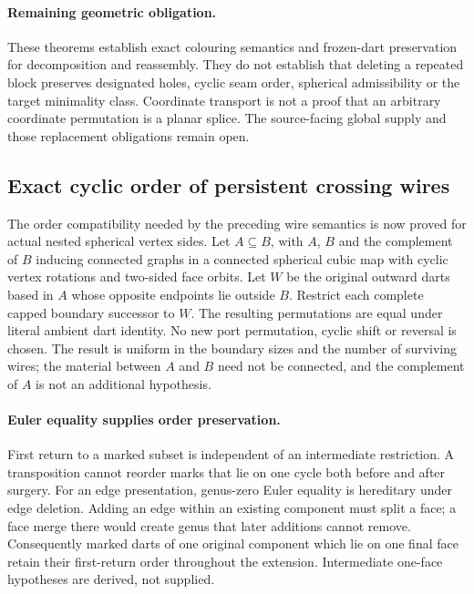 \paragraph{Remaining geometric obligation.}
These theorems establish exact colouring semantics and frozen-dart
preservation for decomposition and reassembly.  They do not establish
that deleting a repeated block preserves designated holes, cyclic seam
order, spherical admissibility or the target minimality class.  Coordinate
transport is not a proof that an arbitrary coordinate permutation is a
planar splice.  The source-facing global supply and those replacement
obligations remain open.

\subsection{Exact cyclic order of persistent crossing wires}
\label{sec:persistent-wire-order}

The order compatibility needed by the preceding wire semantics is now
proved for actual nested spherical vertex sides.  Let $A\subseteq B$,
with $A$, $B$ and the complement of $B$ inducing connected graphs in
a connected spherical cubic map with cyclic vertex rotations and two-sided
face orbits.  Let $W$
be the original outward darts based in $A$ whose opposite endpoints lie
outside $B$.  Restrict each complete capped boundary successor to $W$.
The resulting permutations are equal under literal ambient dart identity.
No new port permutation, cyclic shift or reversal is chosen.
The result is uniform in the boundary sizes and the number of surviving
wires; the material between $A$ and $B$ need not be connected, and the
complement of $A$ is not an additional hypothesis.

\paragraph{Euler equality supplies order preservation.}
First return to a marked subset is independent of an intermediate
restriction.  A transposition cannot reorder marks that lie on one cycle
both before and after surgery.
For an edge presentation, genus-zero Euler equality is hereditary under
edge deletion.  Adding an edge within an existing component must split
a face; a face merge there would create genus that later additions cannot
remove.  Consequently marked darts of one original component which lie
on one final face retain their first-return order throughout the extension.
Intermediate one-face hypotheses are derived, not supplied.

